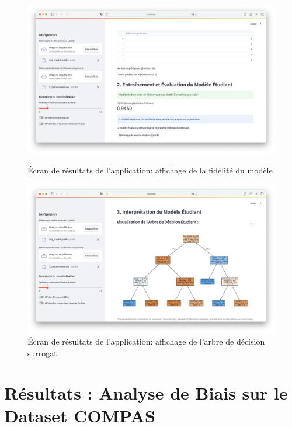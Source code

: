 \documentclass{article}
\begin{document}
    \begin{figure}[h!]
        \centering
        \begin{minipage}[b]{0.48\textwidth}
            \centering
            \includegraphics[width=\textwidth]{app_fidelity.png}
            \caption{Écran de résultats de l'application: affichage de la fidélité du modèle}
            \label{fig:results_view}
        \end{minipage}
        \hfill
        \begin{minipage}[b]{0.48\textwidth}
            \centering
            \includegraphics[width=\textwidth]{app_tree.png}
            \caption{Écran de résultats de l'application: affichage de l'arbre de décision surrogat.}
            \label{fig:input_view}
        \end{minipage}
    \end{figure}

\clearpage

\section{Résultats : Analyse de Biais sur le Dataset COMPAS}
\end{document}
